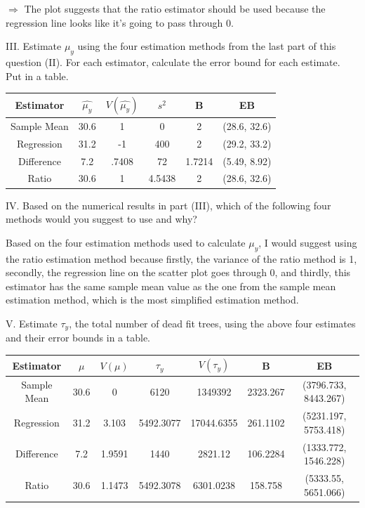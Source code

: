 \documentclass{article}
\begin{document}
\begin{center}
    $\Rightarrow$ The plot suggests that the ratio estimator should be used because the regression line looks like it's going to pass through 0. \\
\end{center}
III. Estimate $\mu_y$ using the four estimation methods from the last part of this question (II). For each estimator, calculate the error bound for each estimate. Put in a table. \\
\smallskip
\begin{center}
\begin{tabular}{|c|c|c|c|c|c|}
    \hline
    Estimator & $\hat{\mu_y}$ & $V(\hat{\mu_y})$ & $s^2$ & B & EB \\
    \hline
    Sample Mean & 30.6 & 1 & 0 & 2 & (28.6, 32.6) \\
    Regression & 31.2 & -1 & 400 & 2 & (29.2, 33.2) \\
    Difference & 7.2 & .7408 & 72 & 1.7214 & (5.49, 8.92) \\
    Ratio & 30.6 & 1 & 4.5438 & 2 & (28.6, 32.6) \\
    \hline
\end{tabular}
\end{center}

IV. Based on the numerical results in part (III), which of the following four methods would you suggest to use and why? \\ 
\begin{center}
    Based on the four estimation methods used to calculate $\mu_y$, I would suggest using the ratio estimation method because firstly, the variance of the ratio method is 1, secondly, the regression line on the scatter plot goes through 0, and thirdly, this estimator has the same sample mean value as the one from the sample mean estimation method, which is the most simplified estimation method. \\
\end{center}

V. Estimate $\tau_y$, the total number of dead fit trees, using the above four estimates and their error bounds in a table. \\
\smallskip
\begin{center}
\begin{tabular}{|c|c|c|c|c|c|c|}
    \hline
    Estimator & $\mu$ & $V(\mu)$ & $\tau_y$ & $V(\tau_y)$ & B & EB \\
    \hline
    Sample Mean & 30.6 & 0 & 6120 & 1349392 & 2323.267 & (3796.733, 8443.267) \\
    Regression & 31.2 & 3.103 & 5492.3077 & 17044.6355 & 261.1102 & (5231.197, 5753.418) \\
    Difference & 7.2 & 1.9591 & 1440 & 2821.12 & 106.2284 & (1333.772, 1546.228) \\
    Ratio & 30.6 & 1.1473 & 5492.3078 & 6301.0238 &158.758 & (5333.55, 5651.066) \\
    \hline
\end{tabular}
\smallskip
\end{center}
\end{document}

